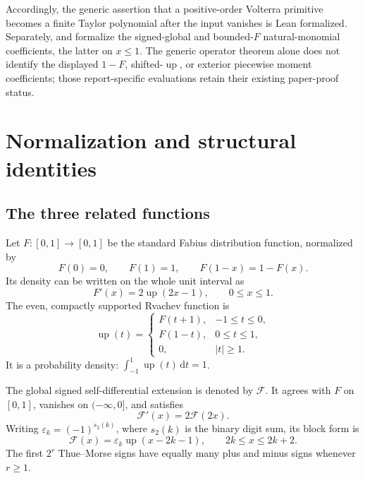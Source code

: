 \documentclass[11pt]{article}
\theoremstyle{definition}
\theoremstyle{remark}
\DeclareMathOperator{\upf}{up}
\newcommand{\dd}{\,\mathrm d}
\newcommand{\FF}{\mathscr F}
\newcommand{\eps}{\varepsilon}
\newcommand{\abs}[1]{\lvert#1\rvert}
\begin{document}
Accordingly, the generic assertion that a positive-order Volterra primitive becomes a finite
Taylor polynomial after the input vanishes is Lean formalized.  Separately,
 and
 formalize the signed-global and
bounded-\(F\) natural-monomial coefficients, the latter on \(x\le1\).  The generic operator
theorem alone does not identify the displayed \(1-F\), shifted-\(\upf\), or exterior
piecewise moment coefficients; those report-specific evaluations retain their existing
paper-proof status.

\section{Normalization and structural identities}

\subsection{The three related functions}

Let \(F:[0,1]\to[0,1]\) be the standard Fabius distribution function, normalized by
\[
 F(0)=0,\qquad F(1)=1,\qquad F(1-x)=1-F(x).
\]
Its density can be written on the whole unit interval as
\begin{equation}
 F'(x)=2\upf(2x-1),\qquad 0\le x\le1.                 \label{eq:Fprime-up}
\end{equation}
The even, compactly supported Rvachev function is
\begin{equation}
 \upf(t)=
 \begin{cases}
   F(t+1),&-1\le t\le0,\\
   F(1-t),&0\le t\le1,\\
   0,&\abs{t}\ge1.
 \end{cases}                                             \label{eq:up-F}
\end{equation}
It is a probability density: \(\int_{-1}^1\upf(t)\dd t=1\).

The global signed self-differential extension is denoted by \(\FF\).  It agrees with
\(F\) on \([0,1]\), vanishes on \(( -\infty,0]\), and satisfies
\begin{equation}
 \FF'(x)=2\FF(2x).                                      \label{eq:global-selfdiff}
\end{equation}
Writing \(\eps_k=(-1)^{s_2(k)}\), where \(s_2(k)\) is the binary digit sum, its block
form is
\begin{equation}
 \FF(x)=\eps_k\upf(x-2k-1),\qquad 2k\le x\le2k+2.       \label{eq:block}
\end{equation}
The first \(2^r\) Thue--Morse signs have equally many plus and minus signs whenever
\(r\ge1\).
\end{document}
